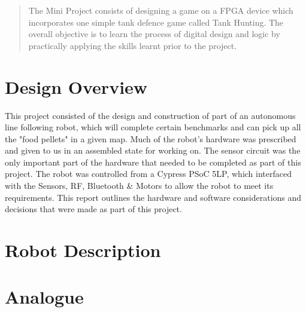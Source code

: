 \documentclass{article}
\begin{document}
\newpage

\maketitle

\begin{abstract}

The Mini Project consists of designing a game on a FPGA device which incorporates one simple tank defence game called Tank Hunting. The overall objective is to learn the process of digital design and logic by practically applying the skills learnt prior to the project.

\end{abstract}


\section{Design Overview}

This project consisted of the design and construction of part of an autonomous line following robot, which will complete certain benchmarks and can pick up all the "food pellets" in a given map. Much of the robot's hardware was prescribed and given to us in an assembled state for working on. The sensor circuit was the only important part of the hardware that needed to be completed as part of this project. The robot was controlled from a Cypress PSoC 5LP, which interfaced with the Sensors, RF, Bluetooth \&  Motors to allow the robot to meet its requirements. This report outlines the hardware and software considerations and decisions that were made as part of this project.

\section{Robot Description}


\section{Analogue}
\end{document}
